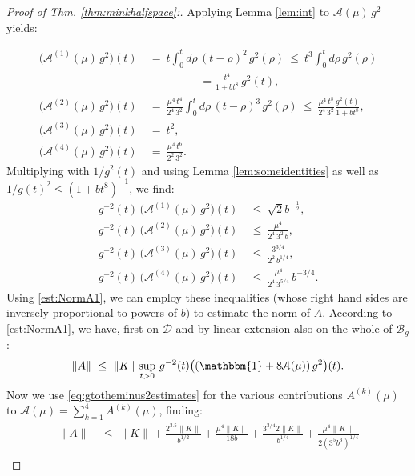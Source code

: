 \documentclass[b5paper,draft,openbib,12pt]{memoir}
\newcommand{\id}{\mathbbm{1}}
\newcommand{\Banach}{\mathscr{B}}
\begin{document}
\begin{proof}[Proof of Thm. \ref{thm:minkhalfspace}:] Applying 
Lemma \ref{lem:int} to \(\mathcal{A}(\mu) \,g^2\) yields:

\begin{align}
    \big(\mathcal{A}^{(1)}(\mu) \, g^2\big)(t)&~=~ t \int_0^t d\rho \, (t-\rho)^2\, g^2(\rho)~\le~ t^3 \int_0^t d\rho \,g^2(\rho)\nonumber\\
    &\hspace{2cm} = \frac{t^4}{1+b t^8} \,g^2(t),\nonumber\\
     \big(\mathcal{A}^{(2)}(\mu) \, g^2\big)(t)&~=~ \frac{\mu^4\, t^4}{2^4\, 3^2} \int_0^t d\rho\, (t-\rho)^3\, g^2(\rho)~\le~ \frac{\mu^4\, t^8}{2^4 \,3^2} \frac{g^2(t)}{1+b t^8},\nonumber\\
    \big( \mathcal{A}^{(3)}(\mu) \, g^2\big) (t) &~=~ t^2,\nonumber\\
    \big( \mathcal{A}^{(4)}(\mu) \, g^2 \big)(t) &~=~ \frac{\mu^4\, t^6}{2^2\, 3^2}.
\end{align}
Multiplying with \(1/g^2(t)\) and using Lemma 
\ref{lem:someidentities} as well as $1/g(t)^2 \le (1+b t^8)^{-1}$, 
we find:
\begin{align}
    g^{-2}(t)\, \big(\mathcal{A}^{(1)}(\mu) \,g^2\big)(t) & ~\le~ \sqrt{2} b^{-\frac{1}{2}},\nonumber\\
    g^{-2}(t)\, \big(\mathcal{A}^{(2)}(\mu) \,g^2\big)(t) & ~\le~ \frac{\mu^4}{2^4 \,3^2 \,b},\nonumber\\
    g^{-2}(t)\, \big( \mathcal{A}^{(3)}(\mu) \, g^2\big)(t) & ~\le~ \frac{3^{3/4}}{2^2\, b^{1/4}},\nonumber\\
   g^{-2}(t)\, \big( \mathcal{A}^{(4)}(\mu) \, g^2\big) (t) & ~\le~ \frac{\mu^4}{2^4 \, 3^{5/4}} \, b^{-3/4}.
\label{eq:gtotheminus2estimates}
\end{align}
Using \eqref{est:NormA1}, we can employ these inequalities (whose 
right hand sides are inversely proportional to powers of $b$) to 
estimate the norm of $A$. According to \eqref{est:NormA1}, we have, 
first on $\mathscr{D}$ and by linear extension also on the whole of 
$\Banach_g$: 
\begin{equation}
	\|A\| ~\leq~ \|K\| \, \sup_{t>0}\, g^{-2}(t) \big((\id + 8\mathcal{A}(\mu)) \, g^2 \big)(t) .
\end{equation}
Now we use \eqref{eq:gtotheminus2estimates} for the various 
contributions 
$A^{(k)}(\mu) $ to $\mathcal{A}(\mu) = \sum_{k=1}^4 A^{(k)}(\mu)$, 
finding:
\begin{align}
	\|A\| & ~\le~ \|K\| + \frac{2^{3.5} \|K\|}{b^{1/2}} + \frac{\mu^4 \|K\|}{18 b} + \frac{3^{3/4} 2 \|K\|}{b^{1/4}} + \frac{\mu^4 \|K\|}{2 (3^5 b^3)^{1/4}}\nonumber\\

\end{align}
\end{proof}
\end{document}
